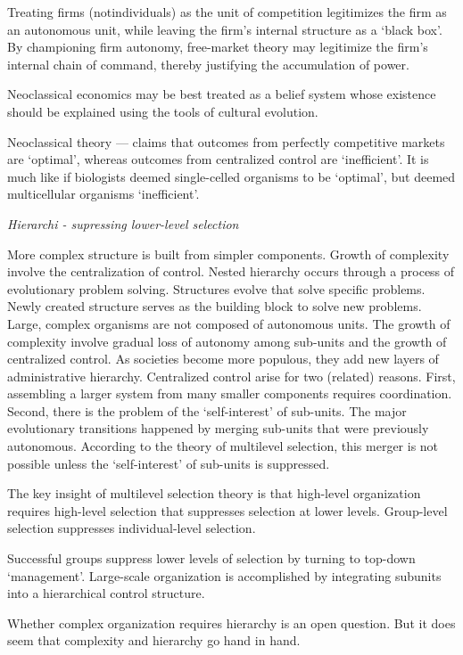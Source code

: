 \documentclass[
]{book}
\begin{document}
Treating firms (notindividuals) as the unit of competition
legitimizes the firm as an autonomous unit, while
leaving the firm's internal structure as a `black box'.
By championing firm autonomy, free-market theory may legitimize the firm's
internal chain of command, thereby justifying the accumulation of power.

Neoclassical economics may be best treated as a belief system
whose existence should be explained using the tools of cultural evolution.

Neoclassical theory --- claims that outcomes from perfectly competitive markets
are `optimal', whereas outcomes from centralized control are `inefficient'.
It is much like if biologists deemed single-celled organisms to be `optimal',
but deemed multicellular organisms `inefficient'.

\emph{Hierarchi - supressing lower-level selection}

More complex structure is built from simpler components.
Growth of complexity involve the centralization of control.
Nested hierarchy occurs through a process of evolutionary problem solving.
Structures evolve that solve specific problems.
Newly created structure serves as the building block to solve new problems.
Large, complex organisms are not composed of autonomous units.
The growth of complexity involve gradual loss of autonomy
among sub-units and the growth of centralized control.
As societies become more populous, they add new layers of administrative hierarchy.
Centralized control arise for two (related) reasons.
First, assembling a larger system from many smaller components requires coordination.
Second, there is the problem of the `self-interest' of sub-units. The major
evolutionary transitions happened by merging sub-units that were previously
autonomous. According to the theory of multilevel selection, this merger is not
possible unless the `self-interest' of sub-units is suppressed.

The key insight of multilevel selection theory is that high-level organization
requires high-level selection that suppresses selection at lower levels.
Group-level selection suppresses individual-level selection.

Successful groups suppress lower levels of selection by turning to top-down
`management'.
Large-scale organization is accomplished by integrating subunits into
a hierarchical control structure.

Whether complex organization requires hierarchy is an open question. But it
does seem that complexity and hierarchy go hand in hand.
\end{document}
